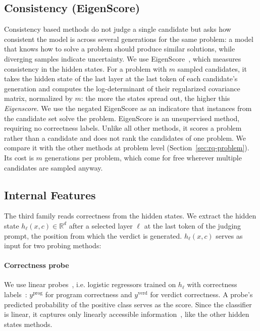 \subsection{Consistency (EigenScore)}
\label{sec:methods-consistency}
Consistency based methods do not judge a single candidate but asks how consistent
the model is across several generations for the same problem: a model that knows
how to solve a problem should produce similar solutions, while diverging
samples indicate uncertainty. 
We use EigenScore~\cite{Chen24Eigenscore},
which measures consistency in the hidden states. For a
problem with $m$ sampled candidates, it takes the hidden state of the last
layer at the last token of each candidate's generation and computes the
log-determinant of their regularized covariance matrix, normalized by $m$: the
more the states spread out, the higher this {\it Eigenscore}. We use the negated
EigenScore as an indicatore that 
instances from the candidate set solve the problem. 
EigenScore is an unsupervised method, requiring no correctness labels. Unlike all other methods, it scores a problem rather than a candidate and does not rank the candidates of one problem. We compare it with the other methods at problem level (Section~\ref{sec:rq-problem}). 
Its cost is $m$ generations per problem, which come for free wherever multiple candidates are sampled anyway.

\subsection{Internal Features}
\label{sec:methods-internal} 
The third family reads correctness from the hidden states. We extract the
hidden state $h_\ell(x, c) \in \mathbb{R}^d$ after a selected layer $\ell$ at the
last token of the judging prompt, the position from which the verdict is
generated. $h_\ell(x, c)$ serves as input for two probing methods:

\paragraph{Correctness probe}
We use linear probes~\cite{Alain2016Probes}, i.e. logistic regressors
trained on $h_\ell$ with correctness labels~\cite{OrgadTGRSKB25,
bui2025openia, Vu2026Autoprobe}: $y^{\mathrm{prog}}$ for program correctness and $y^{\mathrm{verd}}$ for verdict correctness. A probe's predicted probability of the positive class serves as the score. 
Since the classifier is linear, it captures only linearly accessible information~\cite{park2024linear}, like the other hidden states methods.

